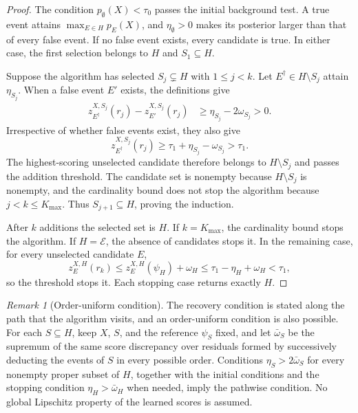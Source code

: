 \documentclass[10pt]{article}
\newcommand{\E}{\mathcal{E}}
\theoremstyle{plain}
\theoremstyle{remark}
\newtheorem{remark}{Remark}
\begin{document}
\begin{proof}
The condition $p_\emptyset(X)<\tau_0$ passes the initial background test. A true event attains $\max_{E\in H}p_E(X)$, and $\eta_\emptyset>0$ makes its posterior larger than that of every false event. If no false event exists, every candidate is true. In either case, the first selection belongs to $H$ and $S_1\subseteq H$.

Suppose the algorithm has selected $S_j\subsetneq H$ with $1\le j<k$. Let $E^\dagger\in H\setminus S_j$ attain $\eta_{S_j}$. When a false event $E'$ exists, the definitions give
\begin{align*}
 z_{E^\dagger}^{X,S_j}(r_j)-z_{E'}^{X,S_j}(r_j)
 &\ge\eta_{S_j}-2\omega_{S_j}>0.
\end{align*}
Irrespective of whether false events exist, they also give
\[
 z_{E^\dagger}^{X,S_j}(r_j)
 \ge\tau_1+\eta_{S_j}-\omega_{S_j}>\tau_1.
\]
The highest-scoring unselected candidate therefore belongs to $H\setminus S_j$ and passes the addition threshold. The candidate set is nonempty because $H\setminus S_j$ is nonempty, and the cardinality bound does not stop the algorithm because $j<k\le K_{\max}$. Thus $S_{j+1}\subseteq H$, proving the induction.

After $k$ additions the selected set is $H$. If $k=K_{\max}$, the cardinality bound stops the algorithm. If $H=\E$, the absence of candidates stops it. In the remaining case, for every unselected candidate $E$,
\[
 z_E^{X,H}(r_k)
 \le z_E^{X,H}(\psi_H)+\omega_H
 \le\tau_1-\eta_H+\omega_H<\tau_1,
\]
so the threshold stops it. Each stopping case returns exactly $H$.
\end{proof}

\begin{remark}[Order-uniform condition]

The recovery condition is stated along the path that the algorithm visits, and an order-uniform condition is also possible. For each $S\subseteq H$, keep $X$, $S$, and the reference $\psi_S$ fixed, and let $\bar\omega_S$ be the supremum of the same score discrepancy over residuals formed by successively deducting the events of $S$ in every possible order. Conditions $\eta_S>2\bar\omega_S$ for every nonempty proper subset of $H$, together with the initial conditions and the stopping condition $\eta_H>\bar\omega_H$ when needed, imply the pathwise condition. No global Lipschitz property of the learned scores is assumed.
\end{remark}
\end{document}
